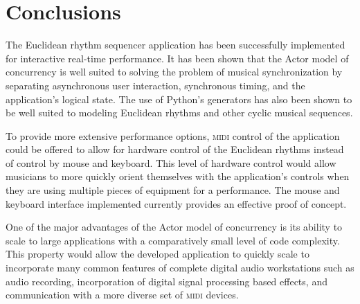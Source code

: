 \documentclass{sig-alternate-05-2015}
\begin{document}
\section{Conclusions}

The Euclidean rhythm sequencer application has been successfully implemented for interactive real-time performance. It has been shown that the Actor model of concurrency is well suited to solving the problem of musical synchronization by separating asynchronous user interaction, synchronous timing, and the application's logical state. The use of Python's generators has also been shown to be well suited to modeling Euclidean rhythms and other cyclic musical sequences.

To provide more extensive performance options, \textsc{midi} control of the application could be offered to allow for hardware control of the Euclidean rhythms instead of control by mouse and keyboard. This level of hardware control would allow musicians to more quickly orient themselves with the application's controls when they are using multiple pieces of equipment for a performance. The mouse and keyboard interface implemented currently provides an effective proof of concept.

One of the major advantages of the Actor model of concurrency is its ability to scale to large applications with a comparatively small level of code complexity. This property would allow the developed application to quickly scale to incorporate many common features of complete digital audio workstations such as audio recording, incorporation of digital signal processing based effects, and communication with a more diverse set of \textsc{midi} devices.

%

\end{document}
